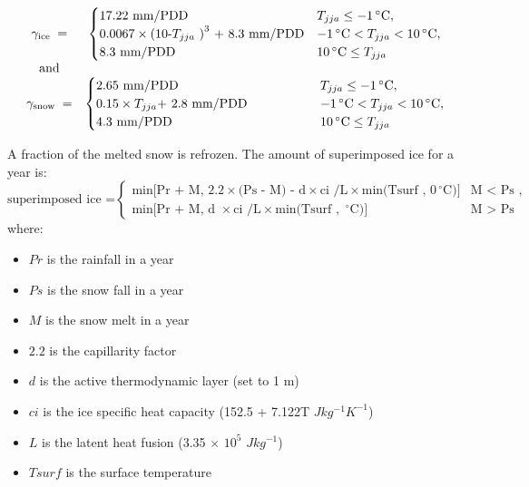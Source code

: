 \begin{equation}
	\begin{array}{ccc}
		\gamma_{\text{ice }} = &
		\begin{cases}
			\text{17.22 mm/PDD}                                                     & T_{jja} \le -1\,^{\circ}\mathrm{C},\\
			\text{0.0067} \times \text{(10-}T_{jja}\text{ )}^3\text{ + 8.3 mm/PDD}  & -1\,^{\circ}\mathrm{C} < T_{jja} < 10\,^{\circ}\mathrm{C},\\
			\text{8.3 mm/PDD}                                                       & 10\,^{\circ}\mathrm{C} \le T_{jja}
		\end{cases}
		\\ \text{and} \\
		\gamma_{\text{snow }}=&
		\begin{cases}
			\text{2.65 mm/PDD}  &                              T_{jja}  \le -1\,^{\circ}\mathrm{C},\\
			\text{0.15} \times T_{jja} \text{+ 2.8 mm/PDD}\hphantom{mm/PDD}  &         -1\,^{\circ}\mathrm{C} < T_{jja} < 10\,^{\circ}\mathrm{C},\\
			\text{4.3 mm/PDD}  &                               10\,^{\circ}\mathrm{C} \le T_{jja}
		\end{cases}
	\end{array}
\end{equation}

A fraction of the melted snow is refrozen. The amount of superimposed ice for a year is:
\begin{equation}
	\text{superimposed ice =}
	\begin{cases}
		\text{min[Pr + M, 2.2} \times \text{(Ps - M) - d} \times \text{ci /L} \times \text{min(Tsurf , 0}\,^{\circ}\mathrm{C}\text{)]} & \text{M }<\text{ Ps ,}\\
		\text{min[Pr + M, d }\times \text{ci /L} \times \text{min(Tsurf , }\,^{\circ}\mathrm{C}\text{)]} & \text{M }>\text{ Ps}
	\end{cases}
\end{equation}
where:
\begin{itemize}
	\item $Pr$ is the rainfall in a year
	\item $Ps$ is the snow fall in a year
	\item $M$ is the snow melt in a year
	\item $2.2$ is the capillarity factor
	\item $d$ is the active thermodynamic layer (set to 1 m)
	\item $c i$ is the ice specific heat capacity (152.5 + 7.122T $Jkg^{-1} K^{-1}$)
	\item $L$ is the latent heat fusion (3.35 $\times$ $10^{5}$ $Jkg^{-1}$)
	\item $Tsurf$ is the surface temperature
\end{itemize}

